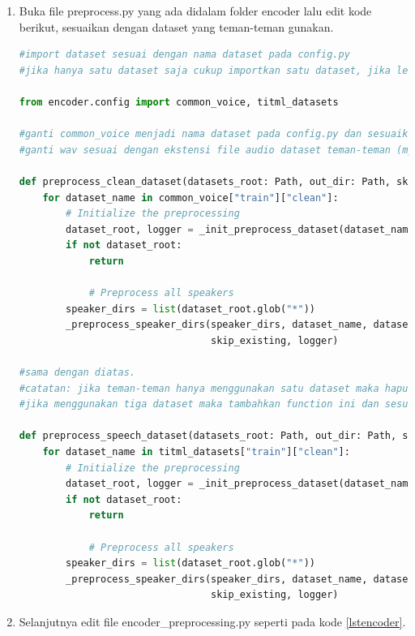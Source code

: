 \begin{enumerate}
\item Buka file preprocess.py yang ada didalam folder encoder lalu edit kode berikut, sesuaikan dengan dataset yang teman-teman gunakan.
\begin{lstlisting}[language=Python, caption=Preprocessing Function]
#import dataset sesuai dengan nama dataset pada config.py
#jika hanya satu dataset saja cukup importkan satu dataset, jika lebih dari dua maka importkan dan pisahkan dengan koma

from encoder.config import common_voice, titml_datasets

#ganti common_voice menjadi nama dataset pada config.py dan sesuaikan dengan yang diimportkan
#ganti wav sesuai dengan ekstensi file audio dataset teman-teman (mp3, flac, wav, m4a)

def preprocess_clean_dataset(datasets_root: Path, out_dir: Path, skip_existing=False):
    for dataset_name in common_voice["train"]["clean"]:
        # Initialize the preprocessing
        dataset_root, logger = _init_preprocess_dataset(dataset_name, datasets_root, out_dir)
        if not dataset_root:
            return

            # Preprocess all speakers
        speaker_dirs = list(dataset_root.glob("*"))
        _preprocess_speaker_dirs(speaker_dirs, dataset_name, datasets_root, out_dir, "wav",
                                 skip_existing, logger)

#sama dengan diatas.
#catatan: jika teman-teman hanya menggunakan satu dataset maka hapus function ini, abaikan, atau komen.
#jika menggunakan tiga dataset maka tambahkan function ini dan sesuaikan dengan dataset teman-teman seperti cara di atas.

def preprocess_speech_dataset(datasets_root: Path, out_dir: Path, skip_existing=False):
    for dataset_name in titml_datasets["train"]["clean"]:
        # Initialize the preprocessing
        dataset_root, logger = _init_preprocess_dataset(dataset_name, datasets_root, out_dir)
        if not dataset_root:
            return

            # Preprocess all speakers
        speaker_dirs = list(dataset_root.glob("*"))
        _preprocess_speaker_dirs(speaker_dirs, dataset_name, datasets_root, out_dir, "wav",
                                 skip_existing, logger)
\end{lstlisting}

\item Selanjutnya edit file encoder\_preprocessing.py seperti pada kode \ref{lstencoder}.


\end{enumerate}

